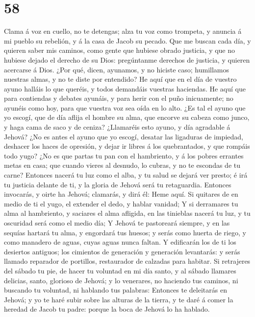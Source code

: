 \hypertarget{section-57}{%
\section{58}\label{section-57}}

 Clama á voz en cuello, no te detengas; alza tu voz como
trompeta, y anuncia á mi pueblo su rebelión, y á la casa de Jacob su
pecado.  Que me buscan cada día, y quieren saber mis
caminos, como gente que hubiese obrado justicia, y que no hubiese dejado
el derecho de su Dios: pregúntanme derechos de justicia, y quieren
acercarse á Dios.  ¿Por qué, dicen, ayunamos, y no hiciste
caso; humillamos nuestras almas, y no te diste por entendido? He aquí
que en el día de vuestro ayuno halláis lo que queréis, y todos demandáis
vuestras haciendas.  He aquí que para contiendas y debates
ayunáis, y para herir con el puño inicuamente; no ayunéis como hoy, para
que vuestra voz sea oída en lo alto.  ¿Es tal el ayuno que
yo escogí, que de día aflija el hombre su alma, que encorve su cabeza
como junco, y haga cama de saco y de ceniza? ¿Llamaréis esto ayuno, y
día agradable á Jehová?  ¿No es antes el ayuno que yo
escogí, desatar las ligaduras de impiedad, deshacer los haces de
opresión, y dejar ir libres á los quebrantados, y que rompáis todo yugo?
 ¿No es que partas tu pan con el hambriento, y á los
pobres errantes metas en casa; que cuando vieres al desnudo, lo cubras,
y no te escondas de tu carne?  Entonces nacerá tu luz como
el alba, y tu salud se dejará ver presto; é irá tu justicia delante de
ti, y la gloria de Jehová será tu retaguardia.  Entonces
invocarás, y oirte ha Jehová; clamarás, y dirá él: Heme aquí. Si
quitares de en medio de ti el yugo, el extender el dedo, y hablar
vanidad;  Y si derramares tu alma al hambriento, y
saciares el alma afligida, en las tinieblas nacerá tu luz, y tu
oscuridad será como el medio día;  Y Jehová te pastoreará
siempre, y en las sequías hartará tu alma, y engordará tus huesos; y
serás como huerta de riego, y como manadero de aguas, cuyas aguas nunca
faltan.  Y edificarán los de ti los desiertos antiguos;
los cimientos de generación y generación levantarás: y serás llamado
reparador de portillos, restaurador de calzadas para habitar.
 Si retrajeres del sábado tu pie, de hacer tu voluntad en
mi día santo, y al sábado llamares delicias, santo, glorioso de Jehová;
y lo venerares, no haciendo tus caminos, ni buscando tu voluntad, ni
hablando tus palabras:  Entonces te deleitarás en Jehová;
y yo te haré subir sobre las alturas de la tierra, y te daré á comer la
heredad de Jacob tu padre: porque la boca de Jehová lo ha hablado.

